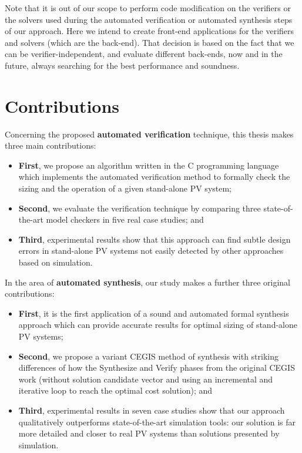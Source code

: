 Note that it is out of our scope to perform code modification on the verifiers or the solvers used during the automated verification or automated synthesis steps of our approach. Here we intend to create front-end applications for the verifiers and solvers (which are the back-end). That decision is based on the fact that we can be verifier-independent, and evaluate different back-ends, now and in the future, always searching for the best performance and soundness.

\section{Contributions}

Concerning the proposed \textbf{automated verification} technique, this thesis makes three main contributions: 
\begin{itemize}
\item \textbf{First}, we propose an algorithm written in the C programming language which implements the automated verification method to formally check the sizing and the operation of a given stand-alone PV system; 
\item \textbf{Second}, we evaluate the verification technique by comparing three state-of-the-art model checkers in five real case studies; and 
\item \textbf{Third}, experimental results show that this approach can find subtle design errors in stand-alone PV systems not easily detected by other approaches based on simulation.
\end{itemize}

In the area of \textbf{automated synthesis}, our study makes a further three original contributions: 
\begin{itemize}
\item \textbf{First}, it is the first application of a sound and automated formal synthesis approach which can provide accurate results for optimal sizing of stand-alone PV systems; 
\item \textbf{Second}, we propose a variant CEGIS method of synthesis with striking differences of how the Synthesize and Verify phases from the original CEGIS work (without solution candidate vector and using an incremental and iterative loop to reach the optimal cost solution); and 
\item \textbf{Third}, experimental results in seven case studies show that our approach qualitatively outperforms state-of-the-art simulation tools: our solution is far more detailed and closer to real PV systems than solutions presented by simulation.
\end{itemize}

